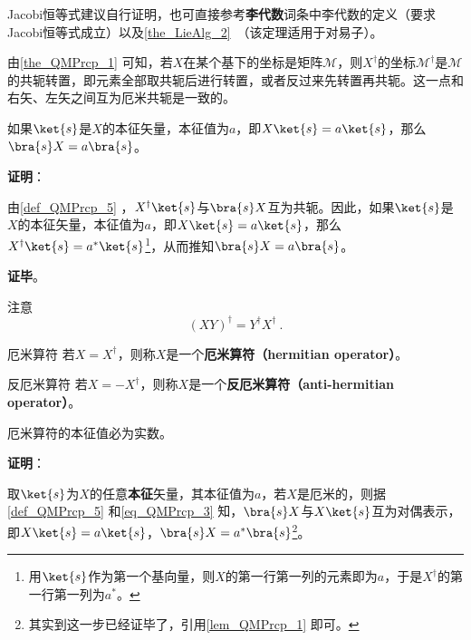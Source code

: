 Jacobi恒等式建议自行证明，也可直接参考\textbf{李代数}词条中李代数的定义（要求Jacobi恒等式成立）以及\autoref{the_LieAlg_2}~（该定理适用于对易子）。




由\autoref{the_QMPrcp_1} 可知，若$X$在某个基下的坐标是矩阵$\mathcal{M}$，则$X^\dagger$的坐标$\mathcal{M}^\dagger$是$\mathcal{M}$的共轭转置，即元素全部取共轭后进行转置，或者反过来先转置再共轭。这一点和右矢、左矢之间互为厄米共轭是一致的。






\begin{lemma}{}\label{lem_QMPrcp_1}
如果$\ket{s}$是$X$的本征矢量，本征值为$a$，即$X\ket{s}=a\ket{s}$，那么$\bra{s}X=a\bra{s}$。
\end{lemma}

\textbf{证明}：

由\autoref{def_QMPrcp_5} ，$X^\dagger\ket{s}$与$\bra{s}X$互为共轭。因此，如果$\ket{s}$是$X$的本征矢量，本征值为$a$，即$X\ket{s}=a\ket{s}$，那么$X^\dagger\ket{s}=a^*\ket{s}$\footnote{用$\ket{s}$作为第一个基向量，则$X$的第一行第一列的元素即为$a$，于是$X^\dagger$的第一行第一列为$a^*$。}，从而推知$\bra{s}X=a\bra{s}$。

\textbf{证毕}。




注意
\begin{equation}
(XY)^\dagger = Y^\dagger X^\dagger~.
\end{equation}


\begin{definition}{厄米算符}\label{def_QMPrcp_12}
若$X=X^\dagger$，则称$X$是一个\textbf{厄米算符（hermitian operator）}。
\end{definition}

\begin{definition}{反厄米算符}\label{def_QMPrcp_19}
若$X=-X^\dagger$，则称$X$是一个\textbf{反厄米算符（anti-hermitian operator）}。
\end{definition}

\begin{theorem}{}\label{the_QMPrcp_2}
厄米算符的本征值必为实数。
\end{theorem}

\textbf{证明}：

取$\ket{s}$为$X$的任意\textbf{本征}矢量，其本征值为$a$，若$X$是厄米的，则据\autoref{def_QMPrcp_5} 和\autoref{eq_QMPrcp_3} 知，$\bra{s}X$与$X\ket{s}$互为对偶表示，即$X\ket{s}=a\ket{s}$，$\bra{s}X=a^*\bra{s}$\footnote{其实到这一步已经证毕了，引用\autoref{lem_QMPrcp_1} 即可。}。

